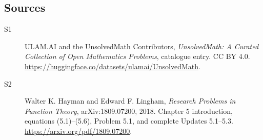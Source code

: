 \documentclass[11pt]{book}
\begin{document}
\subsection{Sources}
\begin{description}
\item[\hypertarget{source:statement:1}{S1}] ULAM.AI and the UnsolvedMath Contributors, \emph{UnsolvedMath: A Curated Collection of Open Mathematics Problems}, catalogue entry. CC BY 4.0. \url{https://huggingface.co/datasets/ulamai/UnsolvedMath}.
\item[\hypertarget{source:statement:2}{S2}] Walter K. Hayman and Edward F. Lingham, \emph{Research Problems in Function Theory}, arXiv:1809.07200, 2018. Chapter 5 introduction, equations (5.1)--(5.6), Problem 5.1, and complete Updates 5.1--5.3. \url{https://arxiv.org/pdf/1809.07200}.
\end{description}
\label{end:statement}
\end{document}
